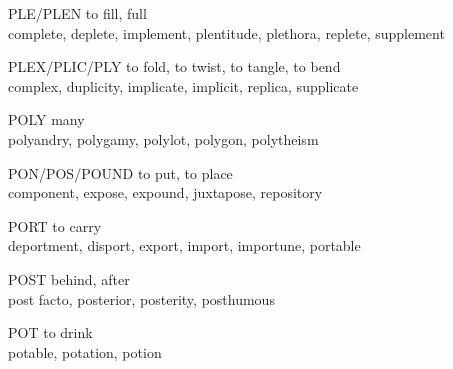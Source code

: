 \begin{flashcard}[Roots]{PLE/PLEN}
to fill, full\\
\vspace{0.2in}
complete, deplete, implement, plentitude, plethora, replete, supplement\\
\end{flashcard}

\begin{flashcard}[Roots]{PLEX/PLIC/PLY}
to fold, to twist, to tangle, to bend\\
\vspace{0.2in}
complex, duplicity, implicate, implicit, replica, supplicate\\
\end{flashcard}

\begin{flashcard}[Roots]{POLY}
many\\
\vspace{0.2in}
polyandry, polygamy, polylot, polygon, polytheism\\
\end{flashcard}

\begin{flashcard}[Roots]{PON/POS/POUND}
to put, to place\\
\vspace{0.2in}
component, expose, expound, juxtapose, repository\\
\end{flashcard}

\begin{flashcard}[Roots]{PORT}
to carry\\
\vspace{0.2in}
deportment, disport, export, import, importune, portable\\
\end{flashcard}

\begin{flashcard}[Roots]{POST}
behind, after\\
\vspace{0.2in}
post facto, posterior, posterity, posthumous\\
\end{flashcard}

\begin{flashcard}[Roots]{POT}
to drink\\
\vspace{0.2in}
potable, potation, potion\\
\end{flashcard}

